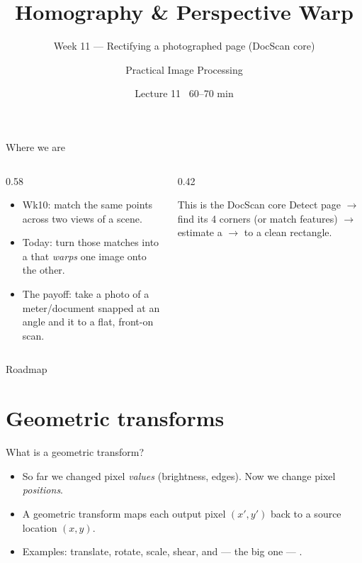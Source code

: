 \documentclass[10pt,aspectratio=169]{beamer}
\title{Homography \& Perspective Warp}
\subtitle{Week 11 — Rectifying a photographed page (DocScan core)}
\author{Practical Image Processing}
\date{Lecture 11 \textbullet\ 60--70 min}
\begin{document}
\maketitle

\begin{frame}{Where we are}
  \begin{columns}[T]
    \begin{column}{0.58\textwidth}
      \begin{itemize}
        \item Wk10: match the same points across two views of a scene.
        \item \alert{Today:} turn those matches into a  that
              \emph{warps} one image onto the other.
        \item The payoff: take a photo of a meter/document snapped at an angle and
               it to a flat, front-on scan.
      \end{itemize}
    \end{column}
    \begin{column}{0.42\textwidth}
      \begin{alertblock}{This is the DocScan core}
        Detect page $\rightarrow$ find its 4 corners (or match features) $\rightarrow$ estimate a
         $\rightarrow$  to a clean rectangle.
      \end{alertblock}
    \end{column}
  \end{columns}
\end{frame}

\begin{frame}{Roadmap}\tableofcontents\end{frame}

\section{Geometric transforms}

\begin{frame}{What is a geometric transform?}
  \begin{itemize}
    \item So far we changed pixel \emph{values} (brightness, edges). Now we change pixel \emph{positions}.
    \item A geometric transform maps each output pixel $(x',y')$ back to a source location $(x,y)$.
    \item Examples: translate, rotate, scale, shear, and — the big one — .
  \end{itemize}
\end{frame}
\end{document}
